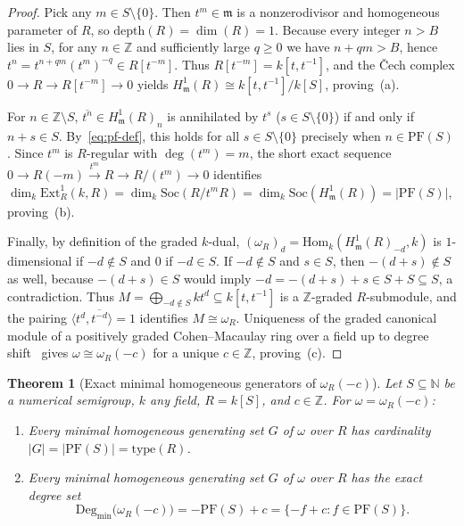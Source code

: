 \documentclass[11pt]{article}
\newtheorem{theorem}{Theorem}[section]
\theoremstyle{definition}
\theoremstyle{remark}
\begin{document}
\begin{proof}
Pick any $m \in S \setminus \{0\}$. Then $t^m \in \mathfrak{m}$ is a nonzerodivisor and homogeneous parameter of $R$, so $\mathrm{depth}(R) = \dim(R) = 1$. Because every integer $n > B$ lies in $S$, for any $n \in \mathbb{Z}$ and sufficiently large $q \ge 0$ we have $n + qm > B$, hence $t^n = t^{n+qm}(t^m)^{-q} \in R[t^{-m}]$. Thus $R[t^{-m}] = k[t, t^{-1}]$, and the \v{C}ech complex $0 \to R \to R[t^{-m}] \to 0$ yields $H^1_{\mathfrak{m}}(R) \cong k[t, t^{-1}]/k[S]$, proving~(a).

For $n \in \mathbb{Z} \setminus S$, $\overline{t^n} \in H^1_{\mathfrak{m}}(R)_n$ is annihilated by $t^s$ ($s \in S \setminus \{0\}$) if and only if $n + s \in S$. By~\eqref{eq:pf-def}, this holds for all $s \in S \setminus \{0\}$ precisely when $n \in \mathrm{PF}(S)$. Since $t^m$ is $R$-regular with $\deg(t^m) = m$, the short exact sequence $0 \to R(-m) \xrightarrow{t^m} R \to R/(t^m) \to 0$ identifies $\dim_k \mathrm{Ext}^1_R(k, R) = \dim_k \mathrm{Soc}(R/t^m R) = \dim_k \mathrm{Soc}(H^1_{\mathfrak{m}}(R)) = |\mathrm{PF}(S)|$, proving~(b).

Finally, by definition of the graded $k$-dual, $(\omega_R)_d = \mathrm{Hom}_k(H^1_{\mathfrak{m}}(R)_{-d}, k)$ is $1$-dimensional if $-d \notin S$ and $0$ if $-d \in S$. If $-d \notin S$ and $s \in S$, then $-(d+s) \notin S$ as well, because $-(d+s) \in S$ would imply $-d = -(d+s) + s \in S + S \subseteq S$, a contradiction. Thus $M = \bigoplus_{-d \notin S} k t^d \subseteq k[t, t^{-1}]$ is a $\mathbb{Z}$-graded $R$-submodule, and the pairing $\langle t^d, \overline{t^{-d}} \rangle = 1$ identifies $M \cong \omega_R$. Uniqueness of the graded canonical module of a positively graded Cohen--Macaulay ring over a field up to degree shift~\cite[Prop.~3.6.12]{BH} gives $\omega \cong \omega_R(-c)$ for a unique $c \in \mathbb{Z}$, proving~(c).
\end{proof}

\begin{theorem}[Exact minimal homogeneous generators of $\omega_R(-c)$]\label{thm:min-gens}
Let $S \subseteq \mathbb{N}$ be a numerical semigroup, $k$ any field, $R = k[S]$, and $c \in \mathbb{Z}$. For $\omega = \omega_R(-c)$:
\begin{enumerate}
  \item[(a)] Every minimal homogeneous generating set $G$ of $\omega$ over $R$ has cardinality $|G| = |\mathrm{PF}(S)| = \mathrm{type}(R)$.
  \item[(b)] Every minimal homogeneous generating set $G$ of $\omega$ over $R$ has the exact degree set
  \begin{equation}\label{eq:true-degrees}
    \mathrm{Deg}_{\min}\bigl(\omega_R(-c)\bigr) = -\mathrm{PF}(S) + c = \{ -f + c : f \in \mathrm{PF}(S) \}.
  \end{equation}
\end{enumerate}
\end{theorem}
\end{document}
